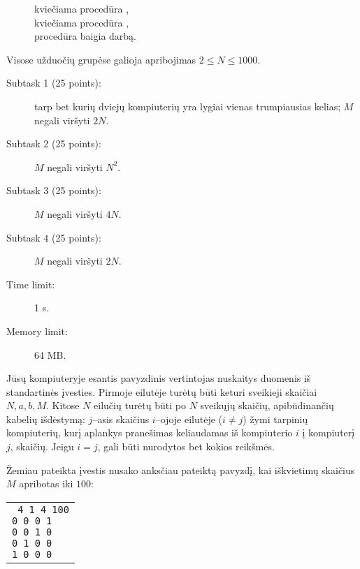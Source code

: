 \documentclass{boi2014-lt}
\begin{document}
    \begin{figure}[H]
        \centering
        kviečiama procedūra , \\
        kviečiama procedūra , \\
        procedūra  baigia darbą.
    \end{figure}

    \Scoring
    Visose užduočių grupėse galioja apribojimas $2 \le N \le 1000$.

    \begin{description}
        \item[Subtask 1 (25 points):] tarp bet kurių dviejų kompiuterių yra
            lygiai vienas trumpiausias kelias; $M$ negali viršyti $2N$.
        \item[Subtask 2 (25 points):] $M$ negali viršyti $N^2$.
        \item[Subtask 3 (25 points):] $M$ negali viršyti $4N$.
        \item[Subtask 4 (25 points):] $M$ negali viršyti $2N$.
    \end{description}

    \Constraints
    \begin{description}
        \item[Time limit:] 1 s.
        \item[Memory limit:] 64 MB.
    \end{description}

    \Experimentation
    Jūsų kompiuteryje esantis pavyzdinis vertintojas nuskaitys duomenis iš
    standartinės įvesties. Pirmoje eilutėje turėtų būti keturi sveikieji
    skaičiai $N, a, b, M$. Kitose $N$ eilučių turėtų būti po $N$ sveikųjų
    skaičių, apibūdinančių kabelių išdėstymą:
    $j$--asis skaičius $i$--ojoje eilutėje ($i \neq j$) žymi tarpinių
    kompiuterių, kurį aplankys pranešimas keliaudamas iš kompiuterio $i$ į
    kompiuterį $j$, skaičių. Jeigu $i = j$, gali būti nurodytos bet kokios
    reikšmės.

    Žemiau pateikta įvestis nusako anksčiau pateiktą pavyzdį, kai iškvietimų
    skaičius $M$ apribotas iki $100$:

    \begin{center}
        \begin{tabular}{p{4cm}}
            {\tt
                4 1 4 100 \newline
                0 0 0 1 \newline
                0 0 1 0 \newline
                0 1 0 0 \newline
                1 0 0 0
            }
        \end{tabular}
    \end{center}
\end{document}
